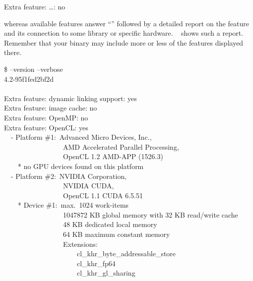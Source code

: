\begin{literal}
  Extra feature: \dots: no
\end{literal}

whereas available features answer ``'' followed by a detailed report on the feature
and its connection to some library or specific hardware.
\exampleName~ shows such a report.  Remember that your binary
may include more or less of the features displayed there.

\begin{exemplar}[htbp]
  \begin{maxipage}
    \centering
    \begin{terminal}
      \$ \app{} --version --verbose \\
        \app{} 4.2-95f1fed2bf2d \\
        ~ \\
        Extra feature: dynamic linking support: yes \\
        Extra feature: image cache: no \\
        Extra feature: OpenMP: no \\
        Extra feature: OpenCL: yes \\
        ~~- Platform \#1:~Advanced Micro Devices, Inc., \\
        ~~~~~~~~~~~~~~~~~AMD Accelerated Parallel Processing, \\
        ~~~~~~~~~~~~~~~~~OpenCL 1.2 AMD-APP (1526.3) \\
        ~~~~* no GPU devices found on this platform \\
        ~~- Platform \#2:~NVIDIA Corporation, \\
        ~~~~~~~~~~~~~~~~~NVIDIA CUDA, \\
        ~~~~~~~~~~~~~~~~~OpenCL 1.1 CUDA 6.5.51 \\
        ~~~~* Device \#1:~max.~1024 work-items \\
        ~~~~~~~~~~~~~~~~~1047872 KB global memory with 32 KB read/write cache \\
        ~~~~~~~~~~~~~~~~~48 KB dedicated local memory \\
        ~~~~~~~~~~~~~~~~~64 KB maximum constant memory \\
        ~~~~~~~~~~~~~~~~~Extensions: \\
        ~~~~~~~~~~~~~~~~~~~~~cl\_khr\_byte\_addressable\_store \\
        ~~~~~~~~~~~~~~~~~~~~~cl\_khr\_fp64 \\
        ~~~~~~~~~~~~~~~~~~~~~cl\_khr\_gl\_sharing \\

\end{terminal}
\end{maxipage}
\end{exemplar}

